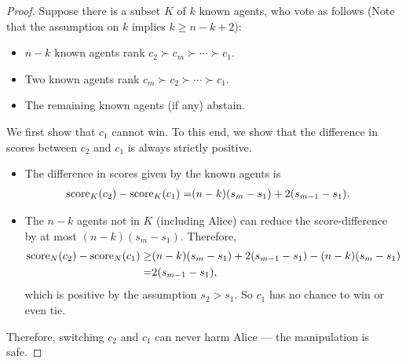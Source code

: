 \iffalse %
\begin{proof}
Suppose there is a subset $K$ of $k$ known agents, who vote as follows (Note that the assumption on $k$ implies $k\geq n-k+2$):
\begin{itemize}
\item $n-k$ known agents rank $c_2 \succ c_m \succ \cdots \succ c_1$.
\item Two known agents rank $c_m \succ c_2 \succ
\cdots \succ c_1$.
\item The remaining known agents (if any) abstain.
\end{itemize}


We first show that $c_1$ cannot win. To this end, we show that the difference in scores between $c_2$ and $c_1$ is always strictly positive.
\begin{itemize}
\item The difference in scores given by the known agents is 
\begin{align*}
\operatorname{score}_K(c_2)-\operatorname{score}_K(c_1) =
&
(n-k)(s_m-s_1) 
+ 2(s_{m-1}-s_1).
\end{align*}
\item The $n-k$ agents not in $K$ (including Alice) 
can reduce the score-difference by at most 
$(n-k)(s_m-s_1)$.
Therefore, 
\begin{align*}
\operatorname{score}_N(c_2)-\operatorname{score}_N(c_1) 
\geq  &
(n-k)(s_m-s_1) 
+ 2(s_{m-1}-s_1)
-(n-k)(s_m-s_1)
\\
= &
2(s_{m-1} - s_1),
\end{align*}
which is positive 
by the assumption $s_2>s_1$.
So $c_1$ has no chance to win or even tie.
\end{itemize}
Therefore, switching $c_2$ and $c_1$ can never harm Alice --- the manipulation is safe.


\end{proof}
